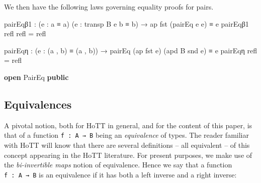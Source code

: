 \documentclass[
  11pt,
  oneside,
  article]{memoir}
\newenvironment{Shaded}{}{}
\newcommand{\KeywordTok}[1]{\textcolor[rgb]{0.00,0.44,0.13}{\textbf{#1}}}
\newcommand{\NormalTok}[1]{#1}
\newcommand{\OtherTok}[1]{\textcolor[rgb]{0.00,0.44,0.13}{#1}}
\theoremstyle{definition}
\theoremstyle{plain}
\newcommand{\0}{\textsf{0}}
\newcommand{\1}{\tn{\textsf{1}}}
\begin{document}
We then have the following laws governing equality proofs for pairs.

\begin{Shaded}
\begin{Highlighting}[]
\NormalTok{    pairEqβ1 }\OtherTok{:} \OtherTok{(}\NormalTok{e }\OtherTok{:}\NormalTok{ a ≡ a\textquotesingle{}}\OtherTok{)} \OtherTok{(}\NormalTok{e\textquotesingle{} }\OtherTok{:}\NormalTok{ transp B e b ≡ b\textquotesingle{}}\OtherTok{)} 
               \OtherTok{→}\NormalTok{ ap fst }\OtherTok{(}\NormalTok{pairEq e e\textquotesingle{}}\OtherTok{)}\NormalTok{ ≡ e}
\NormalTok{    pairEqβ1 refl refl }\OtherTok{=}\NormalTok{ refl}

\NormalTok{    pairEqη }\OtherTok{:} \OtherTok{(}\NormalTok{e }\OtherTok{:} \OtherTok{(}\NormalTok{a , b}\OtherTok{)}\NormalTok{ ≡ }\OtherTok{(}\NormalTok{a\textquotesingle{} , b\textquotesingle{}}\OtherTok{))} 
              \OtherTok{→}\NormalTok{ pairEq }\OtherTok{(}\NormalTok{ap fst e}\OtherTok{)} \OtherTok{(}\NormalTok{apd B snd e}\OtherTok{)}\NormalTok{ ≡ e}
\NormalTok{    pairEqη refl }\OtherTok{=}\NormalTok{ refl}

\KeywordTok{open}\NormalTok{ PairEq }\KeywordTok{public}
\end{Highlighting}
\end{Shaded}

\subsection{Equivalences}\label{equivalences}

A pivotal notion, both for HoTT in general, and for the content of this
paper, is that of a function \texttt{f\ :\ A\ →\ B} being an
\emph{equivalence} of types. The reader familiar with HoTT will know
that there are several definitions -- all equivalent -- of this concept
appearing in the HoTT literature. For present purposes, we make use of
the \emph{bi-invertible maps} notion of equivalence. Hence we say that a
function \texttt{f\ :\ A\ →\ B} is an equivalence if it has both a left
inverse and a right inverse:
\end{document}
